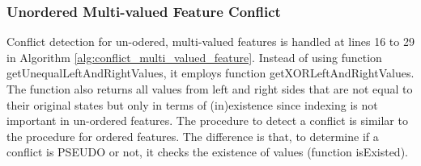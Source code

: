 \subsubsection{Unordered Multi-valued Feature Conflict} 
\label{sec:unordered_conflict}
Conflict detection for un-odered, multi-valued features is handled at lines 16 to 29 in Algorithm \ref{alg:conflict_multi_valued_feature}. Instead of using function \textsf{getUnequalLeftAndRightValues}, it employs function \textsf{getXORLeftAndRightValues}. The function also returns all values from left and right sides that are not equal to their original states but only in terms of (in)existence since indexing is not important in un-ordered features. The procedure to detect a conflict is similar to the procedure for ordered features. The difference is that, to determine if a conflict is \textsf{PSEUDO} or not, it checks the existence of values (function \textsf{isExisted}).


